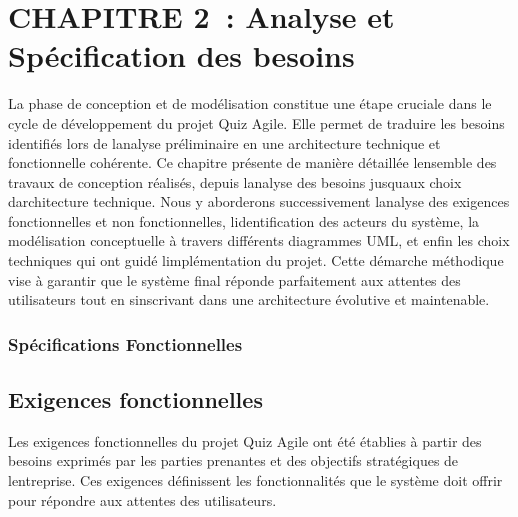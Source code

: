 \documentclass[12pt,a4paper,twoside]{report}
\begin{document}
\hypertarget{section-2}{%
\section{}\label{section-2}}

\hypertarget{chapitre-2-analyse-et-spuxe9cification-des-besoins}{%
\section{CHAPITRE 2~: Analyse et Spécification des
besoins}\label{chapitre-2-analyse-et-spuxe9cification-des-besoins}}

La phase de conception et de modélisation constitue une étape cruciale
dans le cycle de développement du projet Quiz Agile. Elle permet de
traduire les besoins identifiés lors de l\textquotesingle analyse
préliminaire en une architecture technique et fonctionnelle cohérente.
Ce chapitre présente de manière détaillée l\textquotesingle ensemble des
travaux de conception réalisés, depuis l\textquotesingle analyse des
besoins jusqu\textquotesingle aux choix d\textquotesingle architecture
technique. Nous y aborderons successivement l\textquotesingle analyse
des exigences fonctionnelles et non fonctionnelles,
l\textquotesingle identification des acteurs du système, la modélisation
conceptuelle à travers différents diagrammes UML, et enfin les choix
techniques qui ont guidé l\textquotesingle implémentation du projet.
Cette démarche méthodique vise à garantir que le système final réponde
parfaitement aux attentes des utilisateurs tout en
s\textquotesingle inscrivant dans une architecture évolutive et
maintenable.

\hypertarget{spuxe9cifications-fonctionnelles}{%
\subsubsection{Spécifications
Fonctionnelles}\label{spuxe9cifications-fonctionnelles}}

\hypertarget{exigences-fonctionnelles}{%
\subsection{Exigences fonctionnelles}\label{exigences-fonctionnelles}}

Les exigences fonctionnelles du projet Quiz Agile ont été établies à
partir des besoins exprimés par les parties prenantes et des objectifs
stratégiques de l\textquotesingle entreprise. Ces exigences définissent
les fonctionnalités que le système doit offrir pour répondre aux
attentes des utilisateurs.
\end{document}
